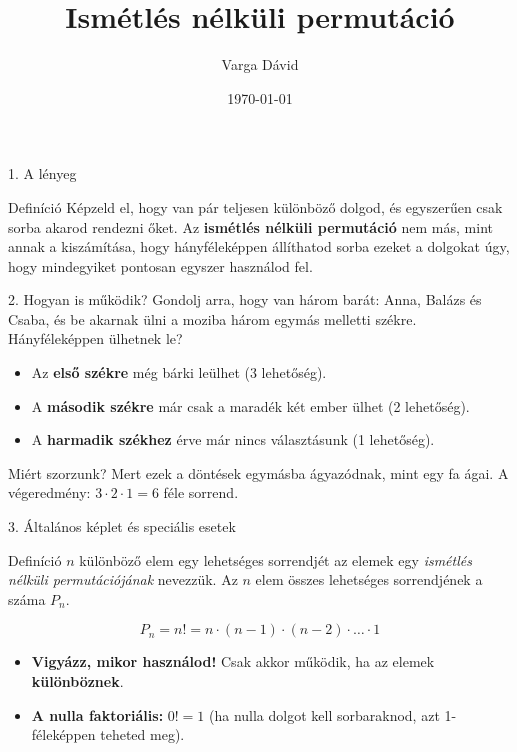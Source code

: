 \documentclass[aspectratio=169,11pt]{beamer}
\begin{document}
\title{Ismétlés nélküli permutáció}
\author{Varga Dávid}
\date{\today}

\begin{frame}
    \titlepage
\end{frame}

\begin{frame}{1. A lényeg}
    \begin{block}{Definíció}
        Képzeld el, hogy van pár teljesen különböző dolgod, és egyszerűen csak sorba akarod rendezni őket. Az \textbf{ismétlés nélküli permutáció} nem más, mint annak a kiszámítása, hogy hányféleképpen állíthatod sorba ezeket a dolgokat úgy, hogy mindegyiket pontosan egyszer használod fel.
    \end{block}
\end{frame}

\begin{frame}{2. Hogyan is működik?}
    Gondolj arra, hogy van három barát: Anna, Balázs és Csaba, és be akarnak ülni a moziba három egymás melletti székre. Hányféleképpen ülhetnek le?
    
    \begin{itemize}
        \item Az \textbf{első székre} még bárki leülhet (3 lehetőség).
        \item A \textbf{második székre} már csak a maradék két ember ülhet (2 lehetőség).
        \item A \textbf{harmadik székhez} érve már nincs választásunk (1 lehetőség).
    \end{itemize}

    \begin{alertblock}{Miért szorzunk?}
        Mert ezek a döntések egymásba ágyazódnak, mint egy fa ágai. A végeredmény: $3 \cdot 2 \cdot 1 = 6$ féle sorrend.
    \end{alertblock}
\end{frame}

\begin{frame}{3. Általános képlet és speciális esetek}
    \begin{block}{Definíció}
        $n$ különböző elem egy lehetséges sorrendjét az elemek egy \emph{ismétlés nélküli permutációjának} nevezzük. Az $n$ elem összes lehetséges sorrendjének a száma $P_n$.
    \end{block}

    $$P_n = n! = n \cdot (n - 1) \cdot (n - 2) \cdot \dots \cdot 1$$

    \begin{itemize}
        \item \textbf{Vigyázz, mikor használod!} Csak akkor működik, ha az elemek \textbf{különböznek}.
        \item \textbf{A nulla faktoriális:} $0! = 1$ (ha nulla dolgot kell sorbaraknod, azt 1-féleképpen teheted meg).
    \end{itemize}
\end{frame}
\end{document}
